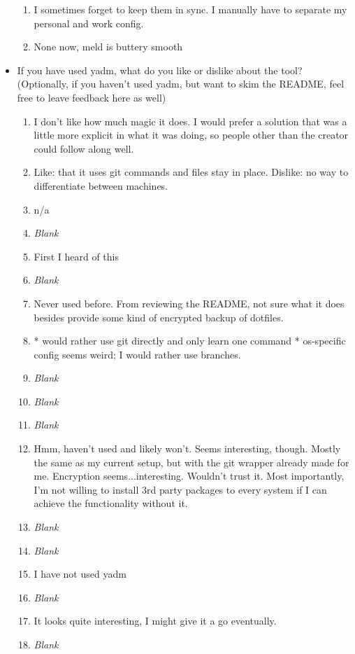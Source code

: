 \documentclass[letterpaper]{jdf}
\begin{document}
\begin{itemize}
\begin{enumerate}
        \item I sometimes forget to keep them in sync. I manually have to separate my personal and work config.
        \item None now, meld is buttery smooth
    \end{enumerate}
    \item If you have used yadm, what do you like or dislike about the tool? (Optionally, if you haven't used yadm, but want to skim the README, feel free to leave feedback here as well)
    \begin{enumerate}
        \item I don't like how much magic it does. I would prefer a solution that was a little more explicit in what it was doing, so people other than the creator could follow along well.
        \item Like: that it uses git commands and files stay in place. Dislike: no way to differentiate between machines.
        \item n/a
        \item \emph{Blank}
        \item First I heard of this
        \item \emph{Blank}
        \item Never used before. From reviewing the README, not sure what it does besides provide some kind of encrypted backup of dotfiles.
        \item * would rather use git directly and only learn one command * os-specific config seems weird; I would rather use branches.
        \item \emph{Blank}
        \item \emph{Blank}
        \item \emph{Blank}
        \item Hmm, haven't used and likely won't. Seems interesting, though. Mostly the same as my current setup, but with the git wrapper already made for me. Encryption seems...interesting. Wouldn't trust it. Most importantly, I'm not willing to install 3rd party packages to every system if I can achieve the functionality without it.
        \item \emph{Blank}
        \item \emph{Blank}
        \item I have not used yadm
        \item \emph{Blank}
        \item It looks quite interesting, I might give it a go eventually.
        \item \emph{Blank}

\end{enumerate}
\end{itemize}
\end{document}
